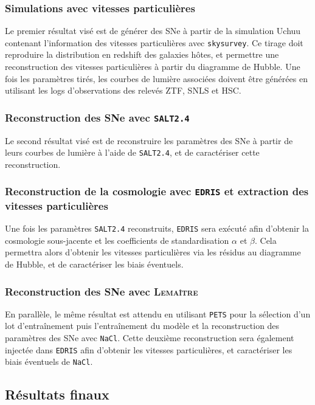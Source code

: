 \documentclass{book}
\def\lemaitre{\textsc{Lemaître}\xspace}
\def\skysurvey{\texttt{skysurvey}\xspace}
\def\pets{\texttt{PETS}\xspace}
\def\nacl{\texttt{NaCl}\xspace}
\def\edris{\texttt{EDRIS}\xspace}
\def\saltd{\texttt{SALT2.4}\xspace}
\begin{document}
\subsubsection{Simulations avec vitesses particulières}

Le premier résultat visé est de générer des SNe à partir de la simulation Uchuu contenant l'information des vitesses particulières avec \skysurvey. Ce tirage doit reproduire la distribution en redshift des galaxies hôtes, et permettre une reconstruction des vitesses particulières à partir du diagramme de Hubble. Une fois les paramètres tirés, les courbes de lumière associées doivent être générées en utilisant les logs d'observations des relevés ZTF, SNLS et HSC.

\subsubsection{Reconstruction des SNe avec \saltd}

Le second résultat visé est de reconstruire les paramètres des SNe à partir de leurs courbes de lumière à l'aide de \saltd, et de caractériser cette reconstruction.

\subsubsection{Reconstruction de la cosmologie avec \edris et extraction des vitesses particulières}

Une fois les paramètres \saltd reconstruits, \edris sera exécuté afin d'obtenir la cosmologie sous-jacente et les coefficients de standardisation $\alpha$ et $\beta$.
Cela permettra alors d'obtenir les vitesses particulières via les résidus au diagramme de Hubble, et de caractériser les biais éventuels.

\subsubsection{Reconstruction des SNe avec \lemaitre}

En parallèle, le même résultat est attendu en utilisant \pets pour la sélection d'un lot d'entraînement puis l'entraînement du modèle et la reconstruction des paramètres des SNe avec \nacl. Cette deuxième reconstruction sera également injectée dans \edris afin d'obtenir les vitesses particulières, et caractériser les biais éventuels de \nacl.

\subsection{Résultats finaux}
\end{document}
